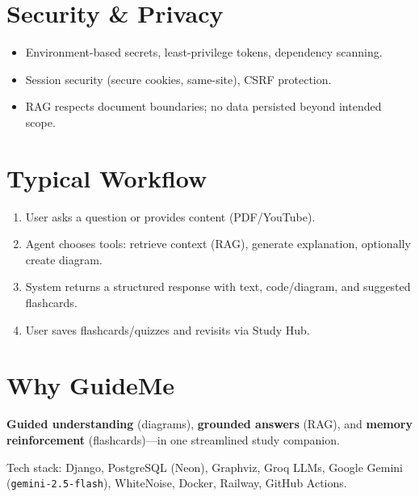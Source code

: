 \documentclass[11pt]{article}
\begin{document}
\section*{Security \& Privacy}
\begin{itemize}
  \item Environment-based secrets, least-privilege tokens, dependency scanning.
  \item Session security (secure cookies, same-site), CSRF protection.
  \item RAG respects document boundaries; no data persisted beyond intended scope.
\end{itemize}

\section*{Typical Workflow}
\begin{enumerate}
  \item User asks a question or provides content (PDF/YouTube).
  \item Agent chooses tools: retrieve context (RAG), generate explanation, optionally create diagram.
  \item System returns a structured response with text, code/diagram, and suggested flashcards.
  \item User saves flashcards/quizzes and revisits via Study Hub.
\end{enumerate}

\section*{Why GuideMe}
\textbf{Guided understanding} (diagrams), \textbf{grounded answers} (RAG), and \textbf{memory reinforcement} (flashcards)---in one streamlined study companion.

\vfill
\footnotesize{
Tech stack: Django, PostgreSQL (Neon), Graphviz, Groq LLMs, Google Gemini (\texttt{gemini-2.5-flash}), WhiteNoise, Docker, Railway, GitHub Actions.
}
\end{document}
